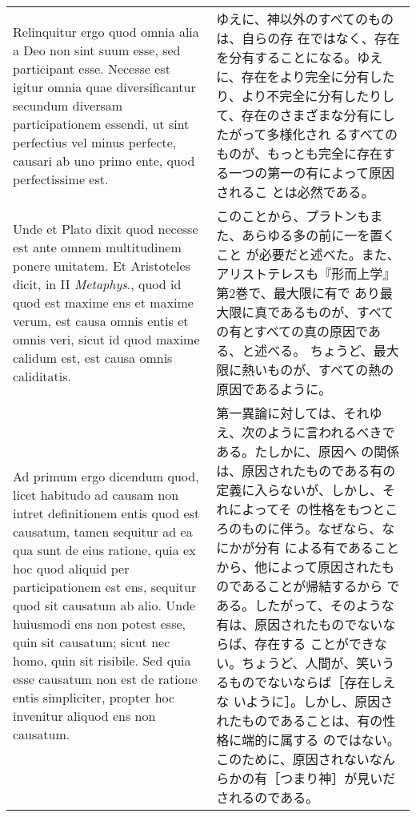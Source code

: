 \documentclass[10pt]{jsarticle} %
\begin{document}
\begin{longtable}{p{21em}p{21em}}
\\

Relinquitur ergo
 quod omnia alia a Deo non sint suum esse, sed participant esse. Necesse
 est igitur omnia quae diversificantur secundum diversam participationem
 essendi, ut sint perfectius vel minus perfecte, causari ab uno primo
 ente, quod perfectissime est. 

&

ゆえに、神以外のすべてのものは、自らの存
在ではなく、存在を分有することになる。ゆえに、存在をより完全に分有した
り、より不完全に分有したりして、存在のさまざまな分有にしたがって多様化され
るすべてのものが、もっとも完全に存在する一つの第一の有によって原因されるこ
とは必然である。

\\

Unde et Plato dixit quod necesse est ante
 omnem multitudinem ponere unitatem. Et Aristoteles dicit, in II
{\it Metaphys}., quod id quod est maxime ens et maxime verum, est causa omnis
 entis et omnis veri, sicut id quod maxime calidum est, est causa omnis
 caliditatis.

&

このことから、プラトンもまた、あらゆる多の前に一を置くこと
が必要だと述べた。また、アリストテレスも『形而上学』第2巻で、最大限に有で
あり最大限に真であるものが、すべての有とすべての真の原因である、と述べる。
ちょうど、最大限に熱いものが、すべての熱の原因であるように。

\\

{\sc Ad primum ergo dicendum} quod, licet habitudo ad causam non intret
 definitionem entis quod est causatum, tamen sequitur ad ea qua sunt de
 eius ratione, quia ex hoc quod aliquid per participationem est ens,
 sequitur quod sit causatum ab alio. Unde huiusmodi ens non potest esse,
 quin sit causatum; sicut nec homo, quin sit risibile. Sed quia esse
 causatum non est de ratione entis simpliciter, propter hoc invenitur
 aliquod ens non causatum.

&

第一異論に対しては、それゆえ、次のように言われるべきである。たしかに、原因へ
の関係は、原因されたものである有の定義に入らないが、しかし、それによってそ
 の性格をもつところのものに伴う。なぜなら、なにかが分有
による有であることから、他によって原因されたものであることが帰結するから
である。したがって、そのような有は、原因されたものでないならば、存在する
 ことができない。ちょうど、人間が、笑いうるものでないならば［存在しえな
 いように］。しかし、原因されたものであることは、有の性格に端的に属する
 のではない。このために、原因されないなんらかの有［つまり神］が見いだされるのである。



\end{longtable}
\end{document}
